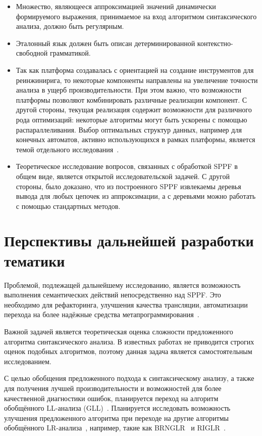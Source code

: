 \begin{itemize}
    \item Множество, являющееся аппроксимацией значений динамически формируемого выражения, принимаемое на вход алгоритмом синтаксического анализа, должно быть регулярным.
    \item Эталонный язык должен быть описан детерминированной контекстно-свободной грамматикой.
    \item Так как платформа создавалась с ориентацией на создание инструментов для реинжинирига, то некоторые компоненты направлены на увеличение точности анализа в ущерб производительности. 
    При этом важно, что возможности платформы позволяют комбинировать различные реализации компонент.
    С другой стороны, текущая реализация содержит возможности для различного рода оптимизаций: некоторые алгоритмы могут быть ускорены с помощью распараллеливания. Выбор оптимальных структур данных, например для конечных автоматов, активно использующихся в рамках платформы, является темой отдельного исследования~\cite{DataStructureForFA}.
    \item Теоретическое исследование вопросов, связанных с обработкой SPPF в общем виде, является открытой исследовательской задачей. С другой стороны, было доказано, что из построенного SPPF извлекаемы деревья вывода для любых цепочек из аппроксимации, а с деревьями можно работать с помощью стандартных методов. 
\end{itemize}

\section*{Перспективы дальнейшей разработки тематики}

Проблемой, подлежащей дальнейшему исследованию, является возможность выполнения семантических действий непосредственно над SPPF. Это необходимо для рефакторинга, улучшения качества трансляции, автоматизации перехода на более надёжные средства метапрограммирования~\cite{JSStagedMetaProgramming,JSStagedMetaProgrammingFull}.

Важной задачей является теоретическая оценка сложности предложенного алгоритма синтаксического анализа. В известных работах не приводится строгих оценок подобных алгоритмов, поэтому данная задача является самостоятельным исследованием.

С целью обобщения предложенного подхода к синтаксическому анализу, а также для получения лучшей производительности и возможностей для более качественной диагностики ошибок, планируется переход на алгоритм обобщённого LL-анализа (GLL)~\cite{GLL,AbstractGLL}. Планируется исследовать возможность улучшения предложенного алгоритма при переходе на другие алгоритмы обобщённого LR-анализа~\cite{GeneralisedlrBIG}, например, такие как BRNGLR~\cite{BRNGLR} и RIGLR~\cite{RIGLR}.

